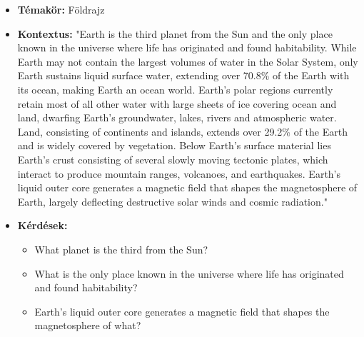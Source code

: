 \begin{itemize}
\item \textbf{Témakör:} Földrajz
\item \textbf{Kontextus:} "Earth is the third planet from the Sun and the only place known in the universe where life has originated and found habitability. While Earth may not contain the largest volumes of water in the Solar System, only Earth sustains liquid surface water, extending over 70.8\% of the Earth with its ocean, making Earth an ocean world. Earth's polar regions currently retain most of all other water with large sheets of ice covering ocean and land, dwarfing Earth's groundwater, lakes, rivers and atmospheric water. Land, consisting of continents and islands, extends over 29.2\% of the Earth and is widely covered by vegetation. Below Earth's surface material lies Earth's crust consisting of several slowly moving tectonic plates, which interact to produce mountain ranges, volcanoes, and earthquakes. Earth's liquid outer core generates a magnetic field that shapes the magnetosphere of Earth, largely deflecting destructive solar winds and cosmic radiation."
\item \textbf{Kérdések:} 
	\begin{itemize}
		\item What planet is the third from the Sun?
		\item What is the only place known in the universe where life has originated and found habitability?
		\item Earth's liquid outer core generates a magnetic field that shapes the magnetosphere of what?
	\end{itemize}
\end{itemize}


